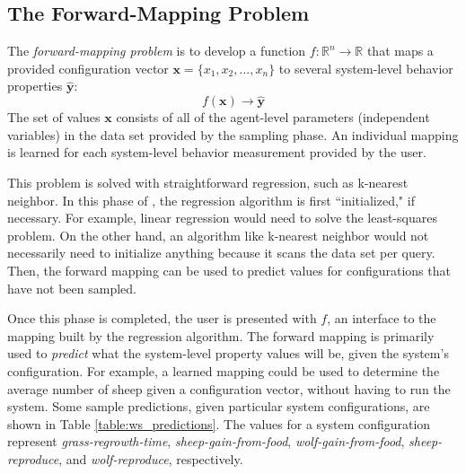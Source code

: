 \subsection{The Forward-Mapping Problem}



The \textit{forward-mapping problem} is to develop a function $f: \mathbb{R}^n \rightarrow \mathbb{R}$ that maps a provided configuration vector $\mathbf x = \{x_1, x_2, ..., x_n \}$ to several system-level behavior properties $\hat {\mathbf y}$:
\[f(\mathbf x) \rightarrow  \hat{\mathbf y}\]
The set of values $\mathbf x$ consists of all of the agent-level parameters (independent variables) in the data set provided by the sampling phase.
An individual mapping is learned for each system-level behavior measurement provided by the user.

This problem is solved with straightforward regression, such as k-nearest neighbor.
In this phase of \fw, the regression algorithm is first ``initialized," if necessary.
For example, linear regression would need to solve the least-squares problem.
On the other hand, an algorithm like k-nearest neighbor would not necessarily need to initialize anything because it scans the data set per query.
Then, the forward mapping can be used to predict values for configurations that have not been sampled.

Once this phase is completed, the user is presented with $f$, an interface to the mapping built by the regression algorithm.
The forward mapping is primarily used to \textit{predict} what the system-level property values will be, given the system's configuration.
For example, a learned mapping could be used to determine the average number of sheep given a configuration vector, without having to run the system.
Some sample predictions, given particular system configurations, are shown in Table \ref{table:ws_predictions}.
The values for a system configuration represent \textit{grass-regrowth-time}, \textit{sheep-gain-from-food}, \textit{wolf-gain-from-food}, \textit{sheep-reproduce}, and \textit{wolf-reproduce}, respectively.

